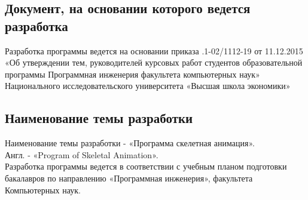 \subsection{Документ, на основании которого ведется разработка}
Разработка программы ведется на основании приказа 
.1-02/1112-19 от 11.12.2015 
«Об  утверждении  тем,  руководителей  курсовых  работ  студентов
образовательной  программы  Программная  инженерия 
факультета 
компьютерных наук» 
Национального исследовательского университета «Высшая школа экономики» 


\subsection{Наименование темы разработки}
Наименование темы разработки - «Программа скелетная анимация». \\ 
Англ. - «Program of Skeletal Animation». \\
Разработка программы ведется в соответствии с учебным планом подготовки бакалавров по направлению «Программная инженерия», факультета Компьютерных наук.